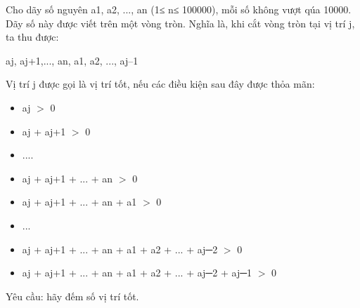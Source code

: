 Cho dãy số nguyên a1, a2, ..., an (1≤ n≤ 100000), mỗi số không vượt qúa 10000. Dãy số này được viết trên một vòng tròn. Nghĩa là, khi cắt vòng   tròn tại vị trí j, ta thu được:  

   aj, aj+1,..., an, a1, a2, ..., aj–1  

   Vị trí j được gọi là vị trí tốt, nếu các điều kiện sau đây được thỏa mãn:  
\begin{itemize}
	\item     aj $>$ 0   
	\item     aj + aj+1 $>$ 0   
	\item     ....   
	\item     aj + aj+1 + ... + an $>$ 0   
	\item     aj + aj+1 + ... + an + a1 $>$ 0   
	\item     ...   
	\item     aj + aj+1 + ... + an + a1 + a2 + ... + aj─2 $>$ 0   
	\item     aj + aj+1 + ... + an + a1 + a2 + ... + aj─2 + aj─1 $>$ 0   
\end{itemize}

   Yêu cầu: hãy đếm số vị trí tốt.